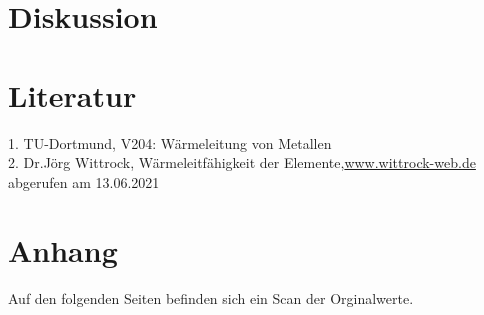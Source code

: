 \section{Diskussion}

\section{Literatur}
1. TU-Dortmund, V204: Wärmeleitung von Metallen\\
2. Dr.Jörg Wittrock, Wärmeleitfähigkeit der Elemente,\hyperlink{http://www.wittrock-web.de/pse_leit_th.html}{www.wittrock-web.de} abgerufen am 13.06.2021\\
\section{Anhang}
Auf den folgenden Seiten befinden sich ein Scan der Orginalwerte.